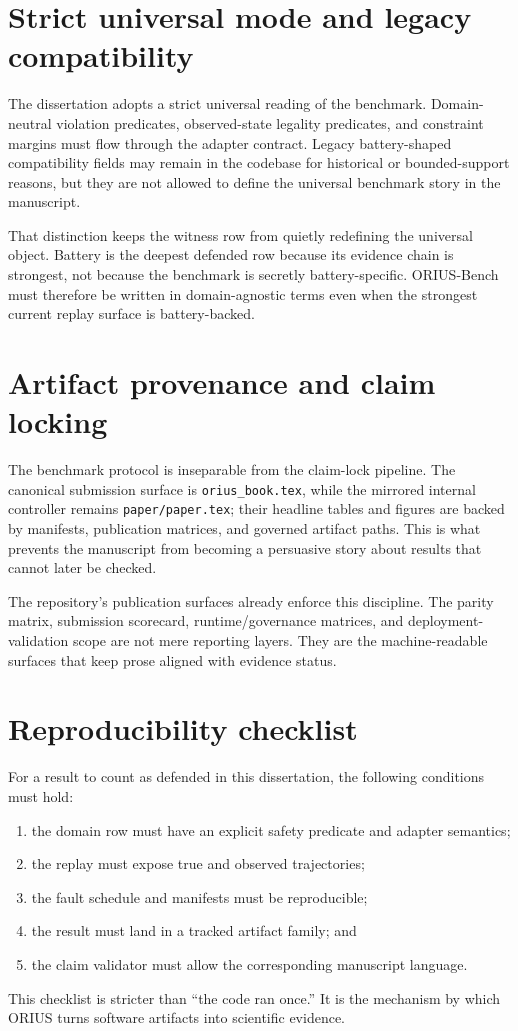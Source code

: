 \section{Strict universal mode and legacy compatibility}
The dissertation adopts a strict universal reading of the benchmark. Domain-neutral
violation predicates, observed-state legality predicates, and constraint margins must flow
through the adapter contract. Legacy battery-shaped compatibility fields may remain in the
codebase for historical or bounded-support reasons, but they are not allowed to define the
universal benchmark story in the manuscript.

That distinction keeps the witness row from quietly redefining the universal object. Battery
is the deepest defended row because its evidence chain is strongest, not because the
benchmark is secretly battery-specific. ORIUS-Bench must therefore be written in
domain-agnostic terms even when the strongest current replay surface is battery-backed.

\section{Artifact provenance and claim locking}
The benchmark protocol is inseparable from the claim-lock pipeline. The canonical submission
surface is \texttt{orius\_book.tex}, while the mirrored internal controller remains
\texttt{paper/paper.tex}; their headline tables and figures are backed by
manifests, publication matrices, and governed artifact paths. This is what prevents the
manuscript from becoming a persuasive story about results that cannot later be checked.

The repository's publication surfaces already enforce this discipline. The parity matrix,
submission scorecard, runtime/governance matrices, and deployment-validation scope are not
mere reporting layers. They are the machine-readable surfaces that keep prose aligned with
evidence status.

\section{Reproducibility checklist}
For a result to count as defended in this dissertation, the following conditions must hold:
\begin{enumerate}
  \item the domain row must have an explicit safety predicate and adapter semantics;
  \item the replay must expose true and observed trajectories;
  \item the fault schedule and manifests must be reproducible;
  \item the result must land in a tracked artifact family; and
  \item the claim validator must allow the corresponding manuscript language.
\end{enumerate}
This checklist is stricter than ``the code ran once.'' It is the mechanism by which ORIUS
turns software artifacts into scientific evidence.

